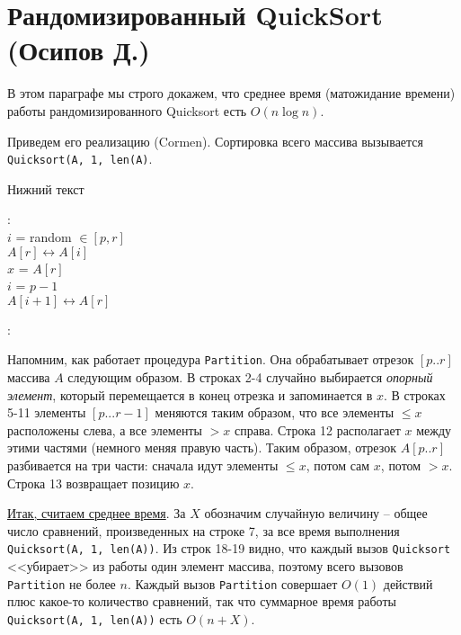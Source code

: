 \section{Рандомизированный QuickSort (Осипов Д.)}

В этом параграфе мы строго докажем, что среднее время (матожидание времени) работы рандомизированного Quicksort есть $O(n\log n)$.

Приведем его реализацию (Cormen). Сортировка всего массива вызывается \texttt{Quicksort(A, 1, len(A)}.

\LinesNumbered
\begin{algorithm}[H]
\caption{Нижний текст}
:\\
$i$ = random $\in [p, r]$\\
$A[r] \leftrightarrow A[i]$\\
$x$ = $A[r]$ \\
$i$ = $p-1$ \\
$A[i+1] \leftrightarrow A[r]$\\

$ $\\

: \\
\end{algorithm}

Напомним, как работает процедура \texttt{Partition}. Она обрабатывает отрезок $[p..r]$ массива $A$ следующим образом.  В строках 2-4 случайно выбирается \textit{опорный элемент}, который перемещается в конец отрезка и запоминается в $x$. В строках 5-11 элементы $[p...r-1]$ меняются таким образом, что все элементы $\leq x$ расположены слева, а все элементы $> x$ справа. Строка 12 располагает $x$ между этими частями (немного меняя правую часть). Таким образом, отрезок $A[p..r]$ разбивается на три части: сначала идут элементы $\leq x$, потом сам $x$, потом $> x$. Строка 13 возвращает позицию $x$.

\underline{Итак, считаем среднее время}. За $X$ обозначим случайную величину -- общее число сравнений, произведенных на строке 7, за все время выполнения \texttt{Quicksort(A, 1, len(A))}. Из строк 18-19 видно, что каждый вызов \texttt{Quicksort} <<убирает>> из работы один элемент массива, поэтому всего вызовов \texttt{Partition} не более $n$. Каждый вызов \texttt{Partition} совершает $O(1)$ действий плюс какое-то количество сравнений, так что суммарное время работы \texttt{Quicksort(A, 1, len(A))} есть $O(n+X)$.

